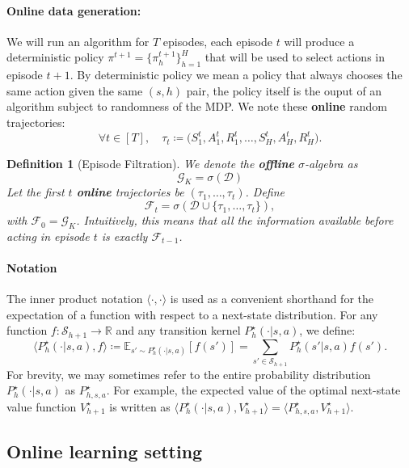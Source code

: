 \documentclass[twoside]{article}
\newtheorem{definition}{Definition}
\begin{document}
\paragraph{Online data generation:}
We will run an algorithm for $T$ episodes, each episode $t$ will produce a deterministic policy $\pi^{t+1} = \{\pi^{t+1}_h\}_{h=1}^H$ that will be used to select actions in episode $t+1$. By deterministic policy we mean a policy that always chooses the same action given the same $(s,h)$ pair, the policy itself is the ouput of an algorithm subject to randomness of the MDP. We note these \textbf{online} random trajectories: 
\[
\forall t \in [T], \quad \tau_t \coloneq \big( S_1^t, A_1^t, R_1^t, \dots, S_H^t, A_H^t, R_H^t\big).
\]
\begin{definition}[Episode Filtration]
\label{def:episode_filtration}
We denote the \textbf{offline} $\sigma$-algebra as 
\[
\mathcal{G}_K = \sigma (\mathcal{D})
\]
Let the first $t$ \textbf{online} trajectories be \( (\tau_1,\dots,\tau_t) \). Define
\[
\mathcal{F}_{t} = \sigma ( \mathcal{D} \cup \{ \tau_1, \dots, \tau_{t} \} ),
\]
with $\mathcal{F}_0 = \mathcal{G}_K$. Intuitively, this means that all the information available before acting in episode $t$ is exactly \( \mathcal{F}_{t-1} \).
\end{definition}

\paragraph{Notation}
The inner product notation $\langle \cdot, \cdot \rangle$ is used as a convenient shorthand for the expectation of a function with respect to a next-state distribution. For any function $f: \mathcal{S}_{h+1} \to \mathbb{R}$ and any transition kernel $P^{\star}_h(\cdot|s,a)$, we define:
\[
\langle P^{\star}_h(\cdot|s,a), f \rangle \coloneqq \mathbb{E}_{s' \sim P^{\star}_h(\cdot|s,a)} [f(s')] = \sum_{s' \in \mathcal{S}_{h+1}} P^{\star}_h(s'|s,a) f(s').
\]
For brevity, we may sometimes refer to the entire probability distribution $P^{\star}_h(\cdot|s,a)$ as $P^{\star}_{h,s,a}$. For example, the expected value of the optimal next-state value function $V_{h+1}^{\star}$ is written as $\langle P_h^{\star}(\cdot|s,a), V_{h+1}^{\star} \rangle = \langle P_{h,s,a}^{\star}, V_{h+1}^{\star} \rangle$.

\subsection{Online learning setting}\label{appsubsec:online}
\end{document}
